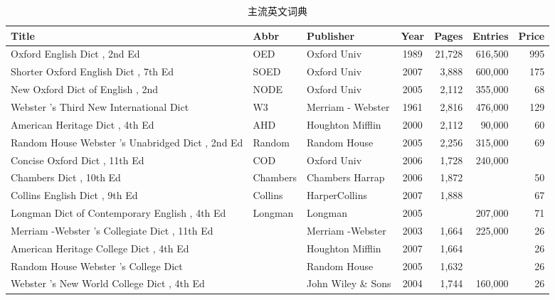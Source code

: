 \documentclass[12pt]{article}
\begin{document}
        \begin{sidewaystable}[htbp]
            \caption{主流英文词典}
            \label{tab:dict}
            \centering
            \begin{tabularx}{550pt}{Xllcrrr}
                \toprule
                Title & Abbr & Publisher & Year & Pages & Entries &
                Price \\
                \midrule
                Oxford English Dict , 2nd Ed & OED & Oxford Univ
                & 1989 & 21,728 & 616,500 & 995 \\
                \midrule
                Shorter Oxford English Dict , 7th Ed & SOED & Oxford
                Univ
                & 2007 & 3,888 & 600,000 & 175 \\
                New Oxford Dict of English , 2nd & NODE & Oxford Univ
                & 2005 & 2,112 & 355,000 & 68 \\
                Webster 's Third New International Dict & W3 & Merriam -
                Webster
                & 1961 & 2,816 & 476,000 & 129 \\
                American Heritage Dict , 4th Ed & AHD & Houghton
                Mifflin
                & 2000 & 2,112 & 90,000 & 60 \\
                Random House Webster 's Unabridged Dict , 2nd Ed &
                Random & Random House
                & 2005 & 2,256 & 315,000 & 69 \\
                \midrule
                Concise Oxford Dict , 11th Ed & COD & Oxford Univ
                & 2006 & 1,728 & 240,000 & \\
                Chambers Dict , 10th Ed & Chambers & Chambers Harrap
                & 2006 & 1,872 & & 50 \\
                Collins English Dict , 9th Ed & Collins & HarperCollins
                & 2007 & 1,888 & & 67 \\
                Longman Dict of Contemporary English , 4th Ed & Longman
                & Longman
                & 2005 & & 207,000 & 71 \\
                Merriam -Webster 's Collegiate Dict , 11th Ed & & Merriam
                -Webster
                & 2003 & 1,664 & 225,000 & 26 \\
                American Heritage College Dict , 4th Ed & & Houghton
                Mifflin
                & 2007 & 1,664 & & 26 \\
                Random House Webster 's College Dict & & Random House
                & 2005 & 1,632 & & 26 \\
                Webster 's New World College Dict , 4th Ed & & John
                Wiley \& Sons
                & 2004 & 1,744 & 160,000 & 26 \\
                \bottomrule
            \end{tabularx}
        \end{sidewaystable}
        
\end{document}
